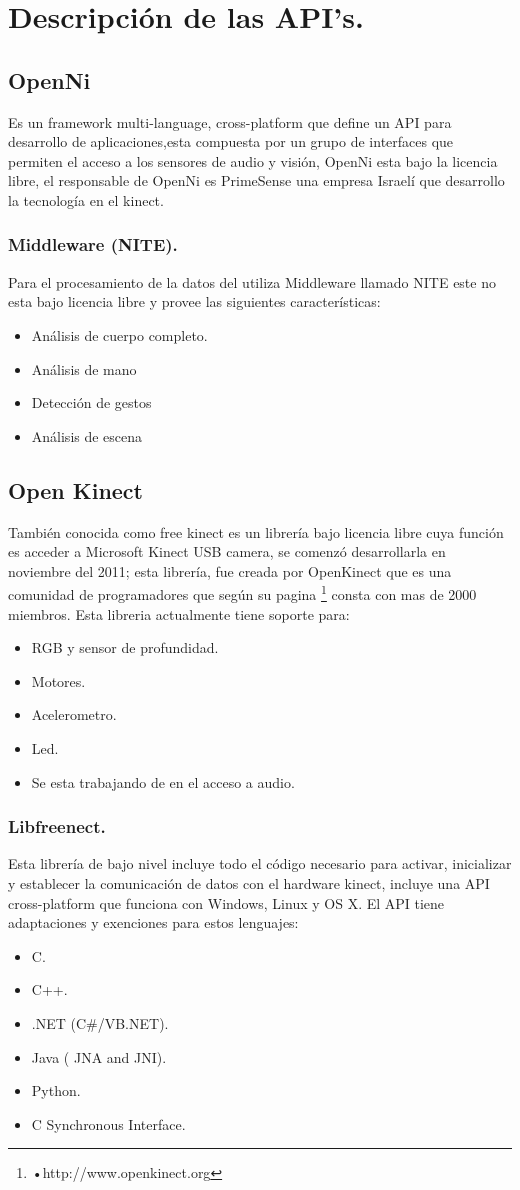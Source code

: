 \documentclass[11pt,a4paper]{article}
\begin{document}
\section{Descripción de las API's.}
\subsection{OpenNi}
Es un framework multi-language, cross-platform que define un API para desarrollo de aplicaciones,esta compuesta por un grupo de interfaces que permiten el acceso a los sensores de audio y visión, OpenNi esta bajo la licencia libre, el responsable de OpenNi es PrimeSense una empresa Israelí que desarrollo la tecnología en el kinect.
\subsubsection{Middleware (NITE).}
Para el procesamiento de la datos del utiliza Middleware llamado NITE este no esta bajo licencia libre y provee las siguientes características:
\begin{itemize}
\item Análisis de cuerpo completo.
\item Análisis de mano
\item Detección de gestos 
\item Análisis de escena 
\end{itemize} 
\subsection{Open Kinect}
También conocida como free kinect es un librería bajo licencia libre cuya función es acceder a Microsoft Kinect USB camera, se comenzó desarrollarla en noviembre del 2011; esta librería, fue creada por OpenKinect que es una comunidad de programadores que según su pagina \footnote{•http://www.openkinect.org} consta con mas de 2000 miembros. Esta libreria actualmente tiene soporte para:
\begin{itemize}
\item RGB y sensor de profundidad.
\item Motores.
\item Acelerometro.
\item Led.
\item Se esta trabajando de en el acceso a audio.
\end{itemize}
\subsubsection{Libfreenect.}
Esta librería de bajo nivel incluye todo el código necesario para activar, inicializar y establecer la comunicación de datos con el hardware kinect, incluye una API cross-platform que funciona con Windows, Linux  y OS X. El API tiene adaptaciones y exenciones para estos lenguajes:
\begin{itemize}
\item C.
\item C++.
\item .NET (C\#/VB.NET).
\item Java ( JNA and JNI).
\item Python.
\item C Synchronous Interface.
\end{itemize} 
\end{document}
